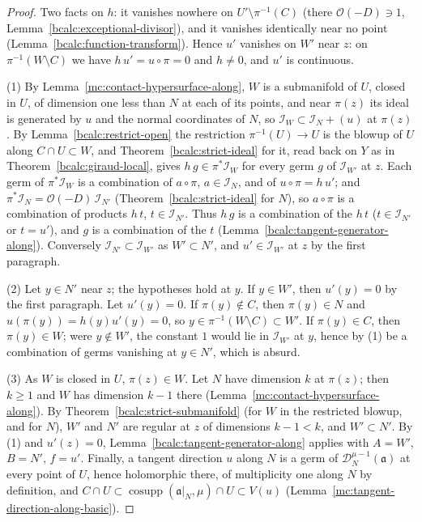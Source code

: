 \begin{proof}
\mixedleanok
Two facts on \(h\): it vanishes nowhere on \(U'\setminus\pi^{-1}(C)\) (there \(\mathcal O(-D)\ni1\), Lemma~\ref{bcalc:exceptional-divisor}), and it vanishes identically
near no point (Lemma~\ref{bcalc:function-transform}). Hence \(u'\) vanishes on \(W'\) near \(z\): on \(\pi^{-1}(W\setminus C)\) we have \(h\,u'=u\circ\pi=0\) and
\(h\ne0\), and \(u'\) is continuous.

(1) By Lemma~\ref{mc:contact-hypersurface-along}, \(W\) is a submanifold of \(U\), closed in \(U\), of dimension one less than \(N\) at each of its points,
and near \(\pi(z)\) its ideal is generated by \(u\) and the normal coordinates of \(N\), so \(\mathcal I_W\subset\mathcal I_N+(u)\) at \(\pi(z)\). By
Lemma~\ref{bcalc:restrict-open} the restriction \(\pi^{-1}(U)\to U\) is the blowup of \(U\) along \(C\cap U\subset W\), and Theorem~\ref{bcalc:strict-ideal} for it,
read back on \(Y\) as in Theorem~\ref{bcalc:giraud-local}, gives \(h\,g\in\pi^*\mathcal I_W\) for every germ \(g\) of \(\mathcal I_{W'}\) at \(z\). Each germ of
\(\pi^*\mathcal I_W\) is a combination of \(a\circ\pi\), \(a\in\mathcal I_N\), and of \(u\circ\pi=h\,u'\); and \(\pi^*\mathcal I_N=\mathcal O(-D)\,\mathcal I_{N'}\)
(Theorem~\ref{bcalc:strict-ideal} for \(N\)), so \(a\circ\pi\) is a combination of products \(h\,t\), \(t\in\mathcal I_{N'}\). Thus \(h\,g\) is a combination of
the \(h\,t\) (\(t\in\mathcal I_{N'}\) or \(t=u'\)), and \(g\) is a combination of the \(t\) (Lemma~\ref{bcalc:tangent-generator-along}). Conversely
\(\mathcal I_{N'}\subset\mathcal I_{W'}\) as \(W'\subset N'\), and \(u'\in\mathcal I_{W'}\) at \(z\) by the first paragraph.

(2) Let \(y\in N'\) near \(z\); the hypotheses hold at \(y\). If \(y\in W'\), then \(u'(y)=0\) by the first paragraph. Let \(u'(y)=0\). If \(\pi(y)\notin C\),
then \(\pi(y)\in N\) and \(u(\pi(y))=h(y)u'(y)=0\), so \(y\in\pi^{-1}(W\setminus C)\subset W'\). If \(\pi(y)\in C\), then \(\pi(y)\in W\); were \(y\notin W'\), the
constant \(1\) would lie in \(\mathcal I_{W'}\) at \(y\), hence by (1) be a combination of germs vanishing at \(y\in N'\), which is absurd.

(3) As \(W\) is closed in \(U\), \(\pi(z)\in W\). Let \(N\) have dimension \(k\) at \(\pi(z)\); then \(k\ge1\) and \(W\) has dimension \(k-1\) there
(Lemma~\ref{mc:contact-hypersurface-along}). By Theorem~\ref{bcalc:strict-submanifold} (for \(W\) in the restricted blowup, and for \(N\)), \(W'\) and \(N'\) are
regular at \(z\) of dimensions \(k-1<k\), and \(W'\subset N'\). By (1) and \(u'(z)=0\), Lemma~\ref{bcalc:tangent-generator-along} applies with \(A=W'\), \(B=N'\),
\(f=u'\). Finally, a tangent direction \(u\) along \(N\) is a germ of \(\mathcal D_N^{\mu-1}(\mathfrak a)\) at every point of \(U\), hence holomorphic there, of
multiplicity one along \(N\) by definition, and \(C\cap U\subset\operatorname{cosupp}(\mathfrak a|_N,\mu)\cap U\subset V(u)\)
(Lemma~\ref{mc:tangent-direction-along-basic}).
\end{proof}


